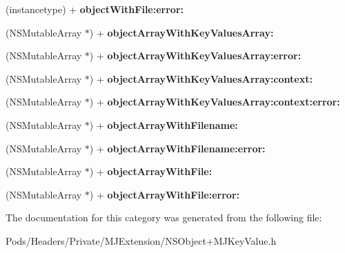 \begin{DoxyCompactItemize}
(instancetype) + {\bfseries object\+With\+File\+:error\+:}
\item 
\mbox{\label{category_n_s_object_07_m_j_key_value_deprecated__v__2__5__16_08_a355159c4a130b5ed529967a6d453550d}} 
(N\+S\+Mutable\+Array $\ast$) + {\bfseries object\+Array\+With\+Key\+Values\+Array\+:}
\item 
\mbox{\label{category_n_s_object_07_m_j_key_value_deprecated__v__2__5__16_08_af39a9101bc7d689702b6212781cb2333}} 
(N\+S\+Mutable\+Array $\ast$) + {\bfseries object\+Array\+With\+Key\+Values\+Array\+:error\+:}
\item 
\mbox{\label{category_n_s_object_07_m_j_key_value_deprecated__v__2__5__16_08_a01254e02fb32e4a087d24431379cb411}} 
(N\+S\+Mutable\+Array $\ast$) + {\bfseries object\+Array\+With\+Key\+Values\+Array\+:context\+:}
\item 
\mbox{\label{category_n_s_object_07_m_j_key_value_deprecated__v__2__5__16_08_a815a2243e5aa4f0890897d2d6787b224}} 
(N\+S\+Mutable\+Array $\ast$) + {\bfseries object\+Array\+With\+Key\+Values\+Array\+:context\+:error\+:}
\item 
\mbox{\label{category_n_s_object_07_m_j_key_value_deprecated__v__2__5__16_08_a0f8538eb74bd568bc1ef982244c9da59}} 
(N\+S\+Mutable\+Array $\ast$) + {\bfseries object\+Array\+With\+Filename\+:}
\item 
\mbox{\label{category_n_s_object_07_m_j_key_value_deprecated__v__2__5__16_08_acb48249e8e7cddeaaed4e625aaffcef9}} 
(N\+S\+Mutable\+Array $\ast$) + {\bfseries object\+Array\+With\+Filename\+:error\+:}
\item 
\mbox{\label{category_n_s_object_07_m_j_key_value_deprecated__v__2__5__16_08_a298f42e2a31d54414942da520d7ebb40}} 
(N\+S\+Mutable\+Array $\ast$) + {\bfseries object\+Array\+With\+File\+:}
\item 
\mbox{\label{category_n_s_object_07_m_j_key_value_deprecated__v__2__5__16_08_a3cfede8658bbce9deeecbdf45ba5338a}} 
(N\+S\+Mutable\+Array $\ast$) + {\bfseries object\+Array\+With\+File\+:error\+:}
\end{DoxyCompactItemize}


The documentation for this category was generated from the following file\+:\begin{DoxyCompactItemize}
\item 
Pods/\+Headers/\+Private/\+M\+J\+Extension/N\+S\+Object+\+M\+J\+Key\+Value.\+h\end{DoxyCompactItemize}
